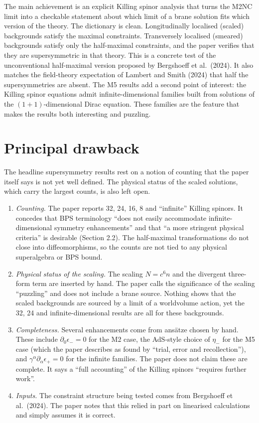\documentclass[11pt]{article}
\begin{document}
The main achievement is an explicit Killing spinor analysis that turns the M2NC limit into a checkable statement about which limit of a brane solution fits which version of the theory. The dictionary is clean. Longitudinally localised (scaled) backgrounds satisfy the maximal constraints. Transversely localised (smeared) backgrounds satisfy only the half-maximal constraints, and the paper verifies that they are supersymmetric in that theory. This is a concrete test of the unconventional half-maximal version proposed by Bergshoeff et al.\ (2024). It also matches the field-theory expectation of Lambert and Smith (2024) that half the supersymmetries are absent. The M5 results add a second point of interest: the Killing spinor equations admit infinite-dimensional families built from solutions of the $(1+1)$-dimensional Dirac equation. These families are the feature that makes the results both interesting and puzzling.

\section{Principal drawback}

The headline supersymmetry results rest on a notion of counting that the paper itself says is not yet well defined. The physical status of the scaled solutions, which carry the largest counts, is also left open.

\begin{enumerate}
\item \emph{Counting.} The paper reports 32, 24, 16, 8 and ``infinite'' Killing spinors. It concedes that BPS terminology ``does not easily accommodate infinite-dimensional symmetry enhancements'' and that ``a more stringent physical criteria'' is desirable (Section 2.2). The half-maximal transformations do not close into diffeomorphisms, so the counts are not tied to any physical superalgebra or BPS bound.

\item \emph{Physical status of the scaling.} The scaling $N=c^6 n$ and the divergent three-form term are inserted by hand. The paper calls the significance of the scaling ``puzzling'' and does not include a brane source. Nothing shows that the scaled backgrounds are sourced by a limit of a worldvolume action, yet the 32, 24 and infinite-dimensional results are all for these backgrounds.

\item \emph{Completeness.} Several enhancements come from ansätze chosen by hand. These include $\partial_0\epsilon_-=0$ for the M2 case, the AdS-style choice of $\eta_-$ for the M5 case (which the paper describes as found by ``trial, error and recollection''), and $\gamma^\alpha\partial_\alpha\epsilon_+=0$ for the infinite families. The paper does not claim these are complete. It says a ``full accounting'' of the Killing spinors ``requires further work''.

\item \emph{Inputs.} The constraint structure being tested comes from Bergshoeff et al.\ (2024). The paper notes that this relied in part on linearised calculations and simply assumes it is correct.
\end{enumerate}
\end{document}
